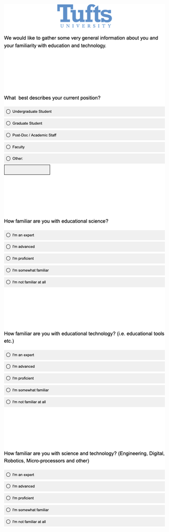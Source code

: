 \begin{multicols}{2}
\includegraphics[width=.75\linewidth]{overleaf/images/q4.png}\\

\end{multicols}
